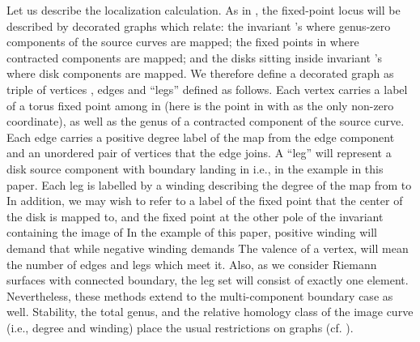 \documentclass[a4paper,11pt]{article}
\providecommand{\PP}{{\mathbb{P}}}
\begin{document}
Let us describe the localization calculation.
As in \cite{Kont}, the fixed-point locus will be
described by decorated
graphs which relate: the invariant \myHighlight{$\PP^1$}\coordHE{}'s where
genus-zero components of the source curves are
mapped; the fixed points in \myHighlight{$\PP^2$}\coordHE{} where
contracted components are mapped; and the
disks sitting inside invariant \myHighlight{$\PP^1$}\coordHE{}'s where
disk components are mapped.  We therefore define
a decorated graph
\coordHE{}
as triple of
vertices \coordHE{}, edges \coordHE{} and ``legs'' 
\coordHE{} defined as
follows.
Each vertex \coordHE{} carries a label \coordHE{}
of a torus fixed point among
\coordHE{}
in \myHighlight{$\PP^2$}\coordHE{} (here \coordHE{} is the point in \myHighlight{$\PP^2$}\coordHE{}
with \coordHE{} as the only non-zero coordinate),
as well as the genus \coordHE{} of a contracted
component \coordHE{} of the source curve. 
Each edge \coordHE{} carries
a positive degree label \coordHE{}
of the map from the edge component \coordHE{}
and an unordered pair \coordHE{} of vertices that
the edge joins.  A ``leg'' \coordHE{}
will represent a disk source component \coordHE{} with
boundary landing in \myHighlight{$L\cap \PP^2,$}\coordHE{} i.e., \coordHE{}
in the example in this paper.  Each leg is labelled
by a winding \coordHE{} describing the degree of the map
from \coordHE{} to \coordHE{}  In addition,
we may wish to refer to \coordHE{} a label of the fixed point
that the center of the disk \coordHE{} is mapped to,
and \coordHE{} the fixed point at the other pole of the
invariant \myHighlight{$\PP^1\subset \PP^2$}\coordHE{} containing the image
of \coordHE{}
In
the example of this paper, positive winding will demand
that \coordHE{} while negative winding demands \coordHE{} 
The valence of a vertex, \coordHE{} will
mean the number of
edges and legs which meet it.
Also, as we consider
Riemann surfaces with connected boundary, the leg
set will consist of exactly one element.  Nevertheless,
these methods extend to the multi-component
boundary case as well.
Stability, the total genus, and the relative homology
class of the image curve
(i.e., degree and winding) place the usual restrictions on
graphs (cf. \cite{Kont}).
\end{document}
